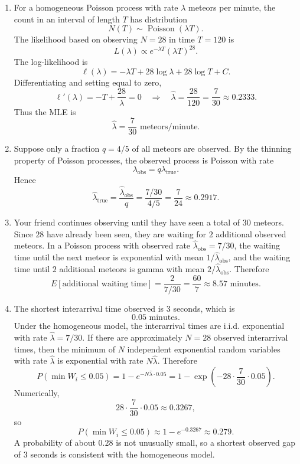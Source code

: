 \documentclass[11pt]{article}
\begin{document}
\begin{enumerate}[label=\textit{\roman*.}]
\item For a homogeneous Poisson process with rate $\lambda$ meteors per minute, the count in an interval of length $T$ has distribution
\[
N(T)\sim \operatorname{Poisson}(\lambda T).
\]
The likelihood based on observing $N=28$ in time $T=120$ is
\[
L(\lambda)\propto e^{-\lambda T}(\lambda T)^{28}.
\]
The log-likelihood is
\[
\ell(\lambda)=-\lambda T+28\log\lambda+28\log T + C.
\]
Differentiating and setting equal to zero,
\[
\ell'(\lambda)=-T+\frac{28}{\lambda}=0
\quad\Longrightarrow\quad
\hat\lambda=\frac{28}{120}=\frac{7}{30}\approx0.2333.
\]
Thus the MLE is
\[
\hat\lambda=\frac{7}{30}\text{ meteors/minute}.
\]

\item Suppose only a fraction $q=4/5$ of all meteors are observed. By the thinning property of Poisson processes, the observed process is Poisson with rate
\[
\lambda_{\mathrm{obs}}=q\lambda_{\mathrm{true}}.
\]
Hence
\[
\hat\lambda_{\mathrm{true}}=\frac{\hat\lambda_{\mathrm{obs}}}{q}
=\frac{7/30}{4/5}=\frac{7}{24}\approx0.2917.
\]

\item Your friend continues observing until they have seen a total of $30$ meteors. Since $28$ have already been seen, they are waiting for $2$ additional observed meteors. In a Poisson process with observed rate $\hat\lambda_{\mathrm{obs}}=7/30$, the waiting time until the next meteor is exponential with mean $1/\hat\lambda_{\mathrm{obs}}$, and the waiting time until $2$ additional meteors is gamma with mean $2/\hat\lambda_{\mathrm{obs}}$. Therefore
\[
E[\text{additional waiting time}]=\frac{2}{7/30}=\frac{60}{7}\approx8.57\text{ minutes}.
\]

\item The shortest interarrival time observed is $3$ seconds, which is
\[
0.05\text{ minutes}.
\]
Under the homogeneous model, the interarrival times are i.i.d. exponential with rate $\hat\lambda=7/30$. If there are approximately $N=28$ observed interarrival times, then the minimum of $N$ independent exponential random variables with rate $\hat\lambda$ is exponential with rate $N\hat\lambda$. Therefore
\[
P(\min W_i\le0.05)=1-e^{-N\hat\lambda\cdot0.05}
=1-\exp\left(-28\cdot\frac{7}{30}\cdot0.05\right).
\]
Numerically,
\[
28\cdot\frac{7}{30}\cdot0.05\approx0.3267,
\]
so
\[
P(\min W_i\le0.05)\approx1-e^{-0.3267}\approx0.279.
\]
A probability of about $0.28$ is not unusually small, so a shortest observed gap of $3$ seconds is consistent with the homogeneous model.
\end{enumerate}
\end{document}
